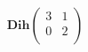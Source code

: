 \documentclass[preview]{standalone}
\begin{document}
\begin{align*}
\mathbf{Dih}\begin{pmatrix}3 & 1\\ 0 & 2\\\end{pmatrix}
\end{align*}
\end{document}
